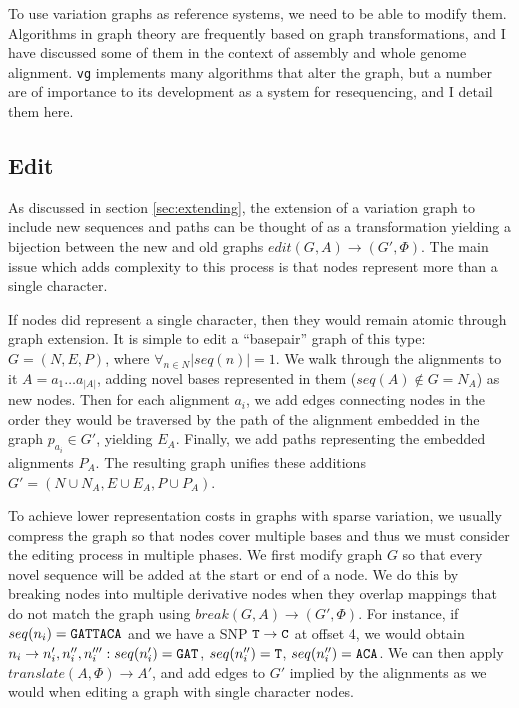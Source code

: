 \documentclass[a4paper,12pt,numbered,oneside]{Classes/PhDThesisPSnPDF}
\begin{document}
To use variation graphs as reference systems, we need to be able to modify them.
Algorithms in graph theory are frequently based on graph transformations, and I have discussed some of them in the context of assembly and whole genome alignment.
{\tt vg} implements many algorithms that alter the graph, but a number are of importance to its development as a system for resequencing, and I detail them here.

\subsection{Edit}

As discussed in section \ref{sec:extending}, the extension of a variation graph to include new sequences and paths can be thought of as a transformation yielding a bijection between the new and old graphs $edit(G, A) \to (G', \Phi)$.
The main issue which adds complexity to this process is that nodes represent more than a single character.

If nodes did represent a single character, then they would remain atomic through graph extension.
It is simple to edit a ``basepair'' graph of this type: $G = (N, E, P)$, where $\forall_{n \in N}{|seq(n)| = 1}$.
We walk through the alignments to it $A = a_1\ldots a_{|A|}$, adding novel bases represented in them ($seq(A) \notin G = N_A$) as new nodes.
Then for each alignment $a_i$, we add edges connecting nodes in the order they would be traversed by the path of the alignment embedded in the graph $p_{a_i} \in G'$, yielding $E_A$.
Finally, we add paths representing the embedded alignments $P_A$.
The resulting graph unifies these additions $G' = (N \cup N_A, E \cup E_A, P \cup P_A)$.

To achieve lower representation costs in graphs with sparse variation, we usually compress the graph so that nodes cover multiple bases and thus we must consider the editing process in multiple phases.
We first modify graph $G$ so that every novel sequence will be added at the start or end of a node.
We do this by breaking nodes into multiple derivative nodes when they overlap mappings that do not match the graph using $break(G, A) \to (G', \Phi)$.
For instance, if $seq(n_i) = {\tt GATTACA}$ and we have a SNP ${\tt T} \to {\tt C}$ at offset 4, we would obtain $n_i \to n_i', n_i'', n_i''' : seq(n_i') = {\tt GAT} $, $seq(n_i'') = {\tt T}$, $seq(n_i'') = {\tt ACA}$.
We can then apply $translate(A, \Phi) \to A'$, and add edges to $G'$ implied by the alignments as we would when editing a graph with single character nodes.
\end{document}
